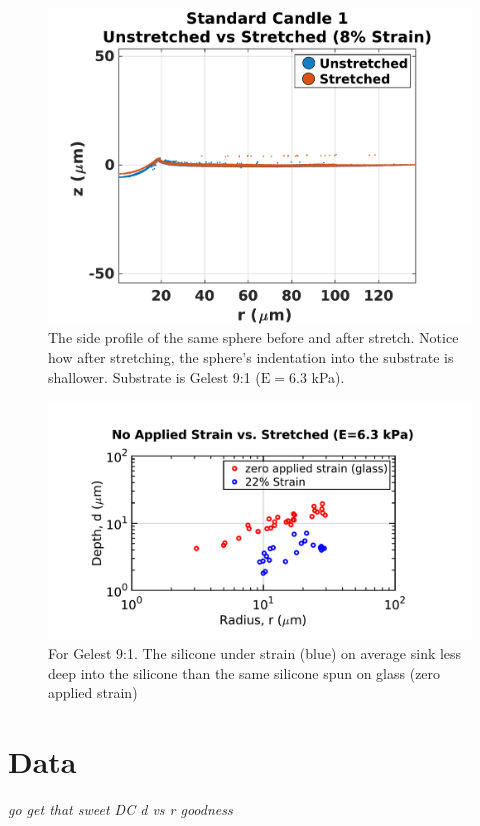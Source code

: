 \begin{figure}
	\centering
	\includegraphics[width=\linewidth]{Chapters/Figures/sc1_unstretched_v_8ml}
	\caption[Side Collapse Comparison]{The side profile of the same sphere before and after stretch. Notice how after stretching, the sphere's indentation into the substrate is shallower. Substrate is Gelest 9:1 ($\text{E}=6.3$ kPa).}
	\label{fig:sc1unstretchedv8ml}
\end{figure}

\begin{figure}
	\centering
	\includegraphics[width=\linewidth]{Chapters/Figures/glass_vs_stretched_190218}
	\caption[Glass vs. Stretched d vs. R]{For Gelest 9:1. The silicone under strain (blue) on average sink less deep into the silicone than the same silicone spun on glass (zero applied strain)}

	\label{fig:glassvsstretched190218}
\end{figure}

\section{Data}
\emph{go get that sweet DC d vs r goodness}